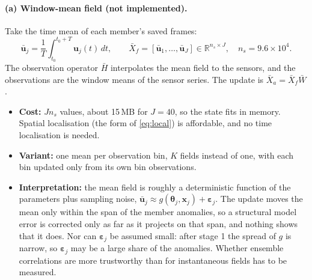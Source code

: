 \documentclass[11pt,a4paper]{article}
\newcommand{\R}{\mathbb{R}}
\begin{document}
\paragraph{(a) Window-mean field (not implemented).} Take the time mean of each
member's saved frames:
\begin{equation}
  \bar{\bm u}_j = \frac{1}{T}\int_{t_0}^{t_0+T} \bm u_j(t)\,dt,
  \qquad
  \bar X_f = [\bar{\bm u}_1,\dots,\bar{\bm u}_J] \in \R^{n_s\times J},
  \quad n_s = 9.6\times10^4 .
\end{equation}
The observation operator $\bar H$ interpolates the mean field to the sensors,
and the observations are the window means of the sensor series. The
update is $\bar X_a = \bar X_f \bar W$.
\begin{itemize}
\item \textbf{Cost:} $J n_s$ values, about 15\,MB for $J = 40$, so the state
  fits in memory. Spatial localisation (the form of \eqref{eq:local}) is
  affordable, and no time localisation is needed.
\item \textbf{Variant:} one mean per observation bin, $K$ fields instead of
  one, with each bin updated only from its own bin observations.
\item \textbf{Interpretation:} the mean field is roughly a deterministic
  function of the parameters plus sampling noise,
  $\bar{\bm u}_j \approx g(\bm\theta_j, \bm x_j) + \bm\varepsilon_j$. The update
  moves the mean only within the span of the member anomalies, so a structural
  model error is corrected only as far as it projects on that span, and nothing
  shows that it does. Nor can $\bm\varepsilon_j$ be assumed small: after stage 1
  the spread of $g$ is narrow, so $\bm\varepsilon_j$ may be a large share of the
  anomalies. Whether ensemble correlations are more trustworthy than for
  instantaneous fields has to be measured.
\end{itemize}
\end{document}
